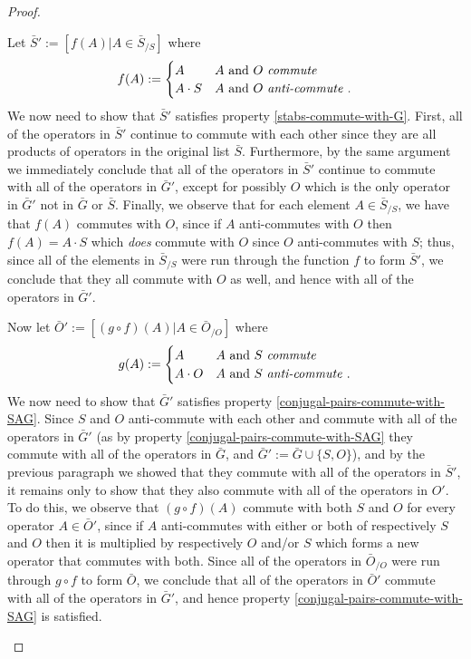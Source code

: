 \documentclass[twocolumn,showpacs,preprintnumbers,amsmath,amssymb,nofootinbib,pra,floatfix]{revtex4}
\begin{document}
\begin{proof}
\begin{description}
Let $\bar S' := [f(A) | A \in \bar S_{\slash S}]$ where $$f(A) :=
\begin{cases}
A & A \text{ and } O \text{ \emph{commute} }\\
A\cdot S  & A \text{ and } O \text{ \emph{anti-commute} }. \\
\end{cases}
$$
We now need to show that $\bar S'$ satisfies property \ref{stabs-commute-with-G}.  First, all of the operators in $\bar S'$ continue to commute with each other since they are all products of operators in the original list $\bar S$.  Furthermore, by the same argument we immediately conclude that all of the operators in $\bar S'$ continue to commute with all of the operators in $\bar G'$, except for possibly $O$ which is the only operator in $\bar G'$ not in $\bar G$ or $\bar S$.  Finally, we observe that for each element $A\in \bar S_{\slash S}$, we have that $f(A)$ commutes with $O$, since if $A$ anti-commutes with $O$ then $f(A)=A\cdot S$ which \emph{does} commute with $O$ since $O$ anti-commutes with $S$;  thus, since all of the elements in $\bar S_{\slash S}$ were run through the function $f$ to form $\bar S'$, we conclude that they all commute with $O$ as well, and hence with all of the operators in $\bar G'$.

Now let $\bar O' := [(g\circ f)(A) | A \in \bar O_{\slash O}]$ where $$g(A) :=
\begin{cases}
A & A \text{ and } S \text{ \emph{commute} }\\
A\cdot O  & A \text{ and } S \text{ \emph{anti-commute} }. \\
\end{cases}
$$
We now need to show that $\bar G'$ satisfies property \ref{conjugal-pairs-commute-with-SAG}.  Since $S$ and $O$ anti-commute with each other and commute with all of the operators in $\bar G'$ (as by property \ref{conjugal-pairs-commute-with-SAG} they commute with all of the operators in $\bar G$, and $\bar G':=\bar G\cup\{S,O\}$), and by the previous paragraph we showed that they commute with all of the operators in $\bar S'$, it remains only to show that they also commute with all of the operators in $O'$.  To do this, we observe that $(g\circ f)(A)$ commute with both $S$ and $O$ for every operator $A\in\bar O'$, since if $A$ anti-commutes with either or both of respectively $S$ and $O$ then it is multiplied by respectively $O$ and/or $S$ which forms a new operator that commutes with both.  Since all of the operators in $\bar O_{\slash O}$  were run through $g\circ f$ to form $\bar O$, we conclude that all of the operators in $\bar O'$ commute with all of the operators in $\bar G'$, and hence property \ref{conjugal-pairs-commute-with-SAG} is satisfied.


\end{description}
\end{proof}
\end{document}
